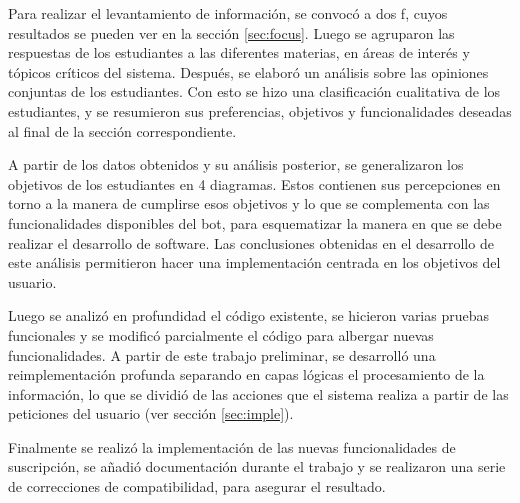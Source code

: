     \par Para realizar el levantamiento de información, se convocó a dos \acrlong{f}, cuyos resultados se pueden ver en la sección \ref{sec:focus}. Luego se agruparon las respuestas de los estudiantes a las diferentes materias, en áreas de interés y tópicos críticos del sistema. Después, se elaboró un análisis sobre las opiniones conjuntas de los estudiantes. Con esto se hizo una clasificación cualitativa de los estudiantes, y se resumieron sus preferencias, objetivos y funcionalidades deseadas al final de la sección correspondiente.

    \par A partir de los datos obtenidos y su análisis posterior, se generalizaron los objetivos de los estudiantes en 4 diagramas. Estos contienen sus percepciones en torno a la manera de  cumplirse esos objetivos y lo que se complementa con las funcionalidades disponibles del bot, para esquematizar la manera en que se debe realizar el desarrollo de software. Las conclusiones obtenidas en el desarrollo de este análisis permitieron hacer una implementación centrada en los objetivos del usuario.

    \par Luego se analizó en profundidad el código existente, se hicieron varias pruebas funcionales y se modificó parcialmente el código para albergar nuevas funcionalidades. A partir de este trabajo preliminar, se desarrolló una reimplementación profunda separando en capas lógicas el procesamiento de la información, lo que se dividió de las acciones que el sistema realiza a partir de las peticiones del usuario (ver sección \ref{sec:imple}).

    \par Finalmente se realizó la implementación de las nuevas funcionalidades de suscripción, se añadió documentación durante el trabajo y se realizaron una serie de correcciones de compatibilidad, para asegurar el resultado.

